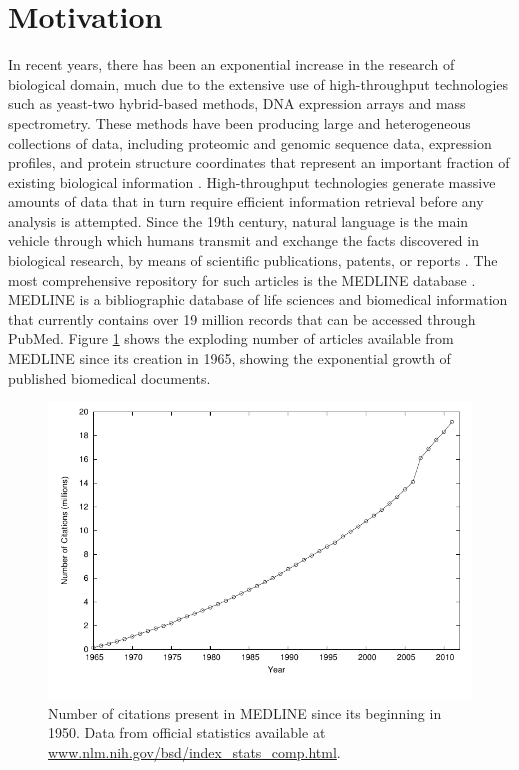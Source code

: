 \section{Motivation}
\label{motivation}

In recent years, there has been an exponential increase in the research of biological domain, much due to the extensive use of high-throughput technologies such as yeast-two hybrid-based methods, DNA expression arrays and mass spectrometry.
These methods have been producing large and heterogeneous collections of data, including proteomic and genomic sequence data, expression profiles, and protein structure coordinates that represent an important fraction of existing biological information \citep{buckingham2004}.
High-throughput technologies generate massive amounts of data that in turn require efficient information retrieval before any analysis is attempted.
Since the 19th century, natural language is the main vehicle through which humans transmit and exchange the facts discovered in biological research, by means of scientific publications, patents, or reports \citep{searls2001}.
The most comprehensive repository for such articles is the MEDLINE database \citep{greenhalgh1997}.
MEDLINE is a bibliographic database of life sciences and biomedical information that currently contains over 19 million records that can be accessed through PubMed.
Figure \ref{medline} shows the exploding number of articles available from MEDLINE since its creation in 1965, showing the exponential growth of published biomedical documents.

\begin{figure} %
\centerline{\includegraphics[width=15cm]{SupportFiles/plots/pubmedgrowth.pdf}}
	\caption[Medline growth.]{Number of citations present in MEDLINE since its beginning in 1950. Data from official statistics available at \url{www.nlm.nih.gov/bsd/index\_stats\_comp.html}.}
\label{medline}
\end{figure}

